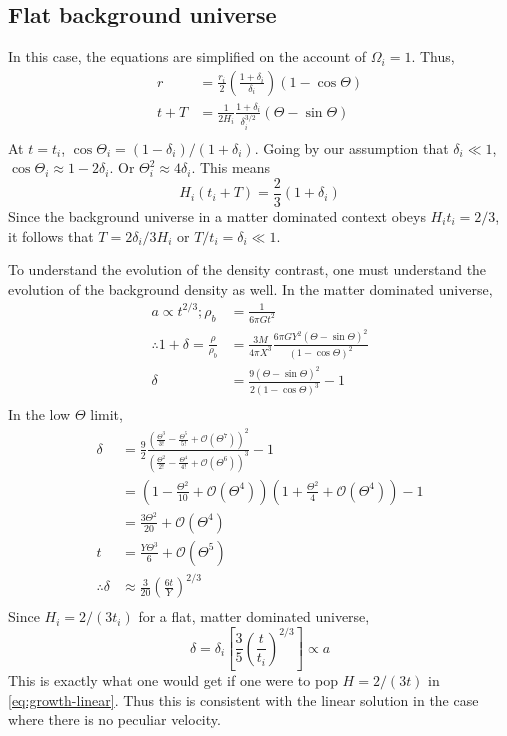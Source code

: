 \documentclass[12pt,a4paper,twoside]{book}
\begin{document}
		\subsection{Flat background universe}
			In this case, the equations are simplified on the account of $\Omega_i=1$. Thus,
			$$
			\begin{aligned}
				r&=\frac{r_i}{2}\left(\frac{1+\delta_i}{\delta_i}\right)(1-\cos\Theta)\\
				t+T&=\frac{1}{2H_i}\frac{1+\delta_i}{\delta_i^{3/2}}(\Theta-\sin\Theta)\\
			\end{aligned}
			$$
			At $t=t_i$, $\cos\Theta_i=(1-\delta_i)/(1+\delta_i)$. Going by our assumption that $\delta_i\ll 1$, $\cos\Theta_i\approx1-2\delta_i$. Or $\Theta_i^2\approx4\delta_i$. This means
			$$
				H_i(t_i+T)=\frac{2}{3}(1+\delta_i)
			$$
			Since the background universe in a  matter dominated context obeys $H_it_i=2/3$, it follows that $T=2\delta_i/3H_i$ or $T/t_i=\delta_i\ll1$.
			
			To understand the evolution of the density contrast, one must understand the evolution of the background density as well. In the matter dominated universe,
			\begin{equation}
				\begin{aligned}
					a\propto t^{2/3}; \rho_b&=\frac{1}{6\pi G t^2}\\
					\therefore 1+\delta=\frac{\rho}{\rho_b}&=\frac{3M}{4\pi X^3}\frac{6\pi GY^2(\Theta-\sin\Theta)^2}{(1-\cos\Theta)^2}\\
					\delta&=\frac{9(\Theta-\sin\Theta)^2}{2(1-\cos\Theta)^3}-1\\
				\end{aligned}
			\end{equation}
			In the low $\Theta$ limit,
			$$
				\begin{aligned}
					\delta&=\frac{9}{2}\frac{(\frac{\Theta^3}{3!}-\frac{\Theta^5}{5!}+\mathcal{O}(\Theta^7))^2}{(\frac{\Theta^2}{2!}-\frac{\Theta^4}{4!}+\mathcal{O}(\Theta^6))^3}-1\\
					&=\left(1-\frac{\Theta^2}{10}+\mathcal{O}(\Theta^4)\right)\left(1+\frac{\Theta^2}{4}+\mathcal{O}(\Theta^4)\right)-1\\
					&=\frac{3\Theta^2}{20}+\mathcal{O}(\Theta^4)\\
					t&=\frac{Y\Theta^3}{6}+\mathcal{O}(\Theta^5)\\
					\therefore \delta&\approx\frac{3}{20}\left(\frac{6t}{Y}\right)^{2/3}\\
				\end{aligned}
			$$
			Since $H_i=2/(3t_i)$ for a flat, matter dominated universe,
			$$
				\delta=\delta_i\left[\frac{3}{5}\left(\frac{t}{t_i}\right)^{2/3}\right]\propto a
			$$
			This is exactly what one would get if one were to pop $H=2/(3t)$ in \ref{eq:growth-linear}. Thus this is consistent with the linear solution in the case where there is no peculiar velocity.
\end{document}
